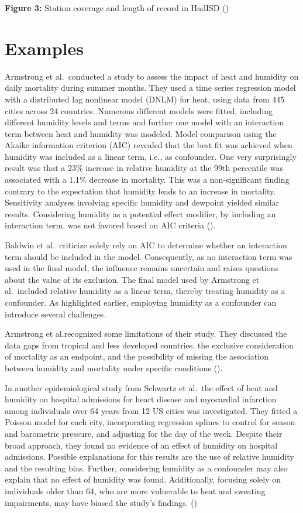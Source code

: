 \documentclass[
]{krantz}
\begin{document}
\textbf{Figure 3:} Station coverage and length of record in HadISD (\citet{raymond})

\section{Examples}\label{examples}

Armstrong et al.~conducted a study to assess the impact of heat and humidity on daily mortality during summer months. They used a time series regression model with a distributed lag nonlinear model (DNLM) for heat, using data from 445 cities across 24 countries. Numerous different models were fitted, including different humidity levels and terms and further one model with an interaction term between heat and humidity was modeled. Model comparison using the Akaike information criterion (AIC) revealed that the best fit was achieved when humidity was included as a linear term, i.e., as confounder. One very surprisingly result was that a 23\% increase in relative humidity at the 99th percentile was associated with a 1.1\% decrease in mortality. This was a non-significant finding contrary to the expectation that humidity leads to an increase in mortality. Sensitivity analyses involving specific humidity and dewpoint yielded similar results. Considering humidity as a potential effect modifier, by including an interaction term, was not favored based on AIC criteria (\citet{armstrong}).

Baldwin et al.~criticize solely rely on AIC to determine whether an interaction term should be included in the model. Consequently, as no interaction term was used in the final model, the influence remains uncertain and raises questions about the value of its exclusion. The final model used by Armstrong et al.~included relative humidity as a linear term, thereby treating humidity as a confounder. As highlighted earlier, employing humidity as a confounder can introduce several challenges.

Armstrong et al.recognized some limitations of their study. They discussed the data gaps from tropical and less developed countries, the exclusive consideration of mortality as an endpoint, and the possibility of missing the association between humidity and mortality under specific conditions (\citet{armstrong}).

In another epidemiological study from Schwartz et al.~the effect of heat and humidity on hospital admissions for heart disease and myocardial infarction among individuals over 64 years from 12 US cities was investigated. They fitted a Poisson model for each city, incorporating regression splines to control for season and barometric pressure, and adjusting for the day of the week. Despite their broad approach, they found no evidence of an effect of humidity on hospital admissions. Possible explanations for this results are the use of relative humidity and the resulting bias. Further, considering humidity as a confounder may also explain that no effect of humidity was found. Additionally, focusing solely on individuals older than 64, who are more vulnerable to heat and sweating impairments, may have biased the study's findings. (\citet{schwartz})
\end{document}
